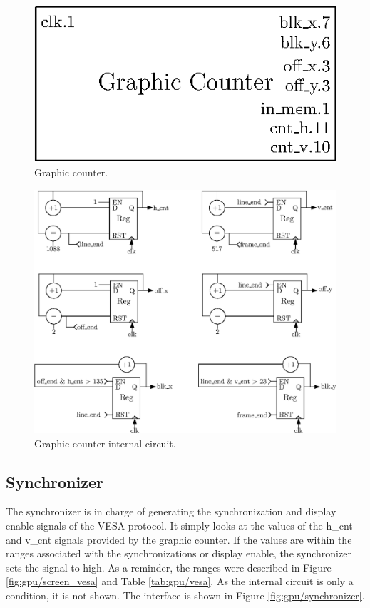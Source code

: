 \begin{figure}[H]
    \centering
    \includegraphics[scale=0.8]{Chapter4-GPU_CLKU/res/gc}
    \caption{Graphic counter.}
    \label{fig:gpu/gc}
\end{figure}

\begin{figure}[H]
    \centering
    \includegraphics[width=\linewidth]{Chapter4-GPU_CLKU/res/gc_in}
    \caption{Graphic counter internal circuit.}
    \label{fig:gpu/gc_in}
\end{figure}

\subsection{Synchronizer}

The synchronizer is in charge of generating the synchronization and display enable signals of the
VESA protocol. It simply looks at the values of the h\_cnt and v\_cnt signals provided by the 
graphic counter. If the values are within the ranges associated with the synchronizations or display
enable, the synchronizer sets the signal to high. As a reminder, the ranges were described in 
Figure \ref{fig:gpu/screen_vesa} and Table \ref{tab:gpu/vesa}. As the internal circuit is 
only a condition, it is not shown. The interface is shown in Figure \ref{fig:gpu/synchronizer}.  

